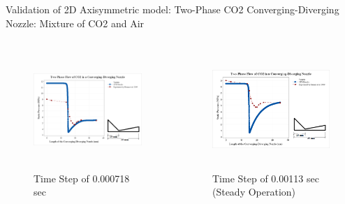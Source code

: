 \begin{frame}{Validation of 2D Axisymmetric model: Two-Phase CO2 Converging-Diverging Nozzle: Mixture of CO2 and Air}
 \begin{columns}
    \begin{figure}
        \centering
        \includegraphics[height=4.5cm]{images/co2718secresult.png}
        \caption{Time Step of 0.000718 sec}
    \end{figure}
  \begin{figure}
        \centering
        \includegraphics[height=4.5cm]{images/co2at135sec.png}
        \caption{Time Step of 0.00113 sec (Steady Operation)}
    \end{figure}
 \end{columns}
\end{frame}

